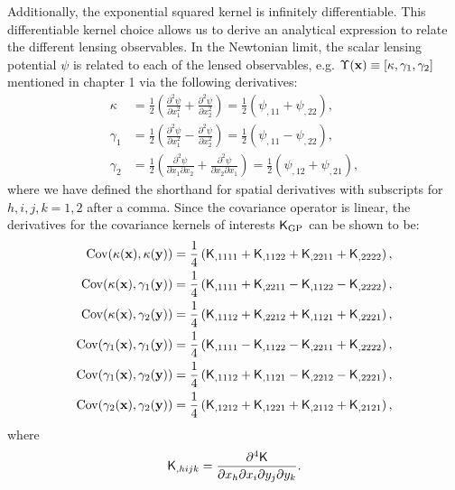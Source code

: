 Additionally, the exponential squared kernel is infinitely differentiable. This
differentiable kernel choice allows us to derive an analytical expression to
relate the different lensing observables.  
In the Newtonian limit, the scalar lensing potential $\psi$ is related to 
each of the lensed observables, e.g. $\Upsilon(\mathbf{x}) \equiv [\kappa, \gamma_1,
\gamma_2]$ mentioned in chapter 1 via the following derivatives:
\begin{align}
\kappa &= \frac{1}{2}\left(\frac{\partial^2 \psi}{\partial x_1^2} +
\frac{\partial^2 \psi}{\partial x_2^2 }\right) 
= \frac{1}{2} (\psi_{,11} + \psi_{,22}),\\ 
\gamma_1 
&=\frac{1}{2}\left(\frac{\partial^2 \psi}{\partial x_1^2} - 
\frac{\partial^2 \psi}{\partial x_2^2}\right) 
= \frac{1}{2} (\psi_{,11} - \psi_{,22}), \\
\gamma_2 
&=\frac{1}{2}\left(\frac{\partial^2 \psi}{\partial x_1 \partial
x_2} + \frac{\partial^2 \psi}{\partial x_2 \partial x_1}\right)
= \frac{1}{2} (\psi_{,12} + \psi_{,21}), 
\end{align}
where we have defined the shorthand for spatial derivatives with
subscripts for $h,i,j,k = 1, 2$ after a comma.
Since the covariance operator is linear,
the derivatives for the covariance kernels of interests $\mathsf{K}_{\rm GP}$
can be shown to be:
\begin{align}
	\label{eq:kernel_derivatives1}
	\mathrm{Cov} (\kappa(\mathbf{x}), \kappa(\mathbf{y}))
&= \frac{1}{4}\left(
\mathsf{K}_{,1111} + \mathsf{K}_{,1122} + \mathsf{K}_{,2211} + \mathsf{K}_{,2222}
\right), \\
\mathrm{Cov}(\kappa(\mathbf{x}), \gamma_1(\mathbf{y})) &= \frac{1}{4}\left(
\mathsf{K}_{,1111} + \mathsf{K}_{,2211} - \mathsf{K}_{,1122} - \mathsf{K}_{,2222}
\right), \\
\mathrm{Cov}(\kappa(\mathbf{x}), \gamma_2(\mathbf{y})) &= \frac{1}{4}\left(
\mathsf{K}_{,1112} + \mathsf{K}_{,2212} + \mathsf{K}_{,1121} + \mathsf{K}_{,2221}
\right),\\
\mathrm{Cov}(\gamma_1(\mathbf{x}), \gamma_1(\mathbf{y})) &= \frac{1}{4}\left(
\mathsf{K}_{,1111} - \mathsf{K}_{,1122} - \mathsf{K}_{,2211} + \mathsf{K}_{,2222}
\right), \\
\mathrm{Cov}(\gamma_1(\mathbf{x}), \gamma_2(\mathbf{y})) &= \frac{1}{4}\left(
\mathsf{K}_{,1112} + \mathsf{K}_{,1121} - \mathsf{K}_{,2212} - \mathsf{K}_{,2221}
\right), \\
\mathrm{Cov}(\gamma_2(\mathbf{x}), \gamma_2(\mathbf{y})) &= \frac{1}{4}\left(
\mathsf{K}_{,1212} + \mathsf{K}_{,1221} + \mathsf{K}_{,2112} + \mathsf{K}_{,2121}
\right),
\end{align}
where
\begin{equation}
	\mathsf{K}_{,hijk} = \frac{\partial^4 \mathsf{K}}{\partial x_h \partial x_i
	\partial y_j \partial y_k}.
\end{equation}

